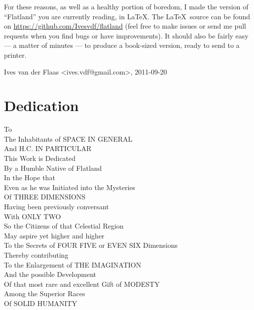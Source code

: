 \documentclass[12pt, a4paper, oneside]{memoir}
\begin{document}
For these reasons, as well as a healthy portion of boredom, I made the version
of ``Flatland'' you are currently reading, in \LaTeX. The \LaTeX\ source can be
found on \url{https://github.com/Ivesvdf/flatland} (feel free to make issues
or send me pull requests when you find bugs or have improvements). It should
also be fairly easy --- a matter of minutes --- to produce a book-sized
version, ready to send to a printer. 

\vspace{1cm}

\hfill Ives van der Flaas <ives.vdf@gmail.com>, 2011-09-20


\chapter*{Dedication}

\begin{center}
To\\
The Inhabitants of SPACE IN GENERAL\\
And H.C. IN PARTICULAR\\
This Work is Dedicated\\
By a Humble Native of Flatland\\
In the Hope that\\
Even as he was Initiated into the Mysteries\\
Of THREE DIMENSIONS\\
Having been previously conversant\\
With ONLY TWO\\
So the Citizens of that Celestial Region\\
May aspire yet higher and higher\\
To the Secrets of FOUR FIVE or EVEN SIX Dimensions\\
Thereby contributing\\
To the Enlargement of THE IMAGINATION\\
And the possible Development\\
Of that most rare and excellent Gift of MODESTY\\
Among the Superior Races\\
Of SOLID HUMANITY\\
\end{center}
\end{document}
